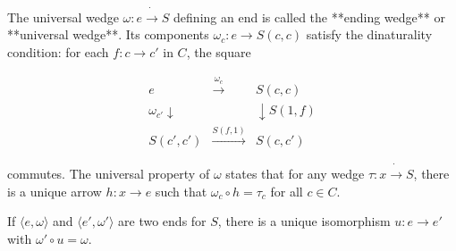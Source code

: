 The universal wedge $\omega: e \mathbin{\dot{\rightarrow}} S$ defining an end is called the **ending wedge** or **universal wedge**. Its components $\omega_c: e \rightarrow S(c, c)$ satisfy the dinaturality condition: for each $f: c \rightarrow c'$ in $C$, the square

$$\begin{array}{ccc}
e & \xrightarrow{\omega_c} & S(c, c) \\
\omega_{c'} \downarrow & & \downarrow S(1, f) \\
S(c', c') & \xrightarrow{S(f, 1)} & S(c, c')
\end{array}$$

commutes. The universal property of $\omega$ states that for any wedge $\tau: x \mathbin{\dot{\rightarrow}} S$, there is a unique arrow $h: x \rightarrow e$ such that $\omega_c \circ h = \tau_c$ for all $c \in C$.

If $\langle e, \omega \rangle$ and $\langle e', \omega' \rangle$ are two ends for $S$, there is a unique isomorphism $u: e \rightarrow e'$ with $\omega' \circ u = \omega$.
